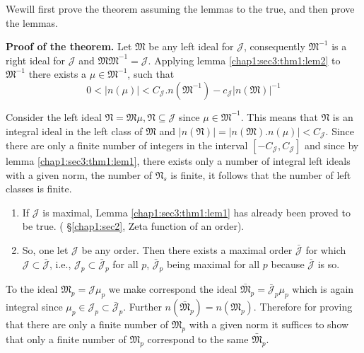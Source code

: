 We\pageoriginale will first prove the theorem assuming the lemmas to the true, and
then prove the lemmas. 

\medskip
\noindent \textbf{Proof of the theorem.}
  Let $\mathfrak{M}$ be any left ideal for $\mathcal{J}$, consequently
  $\mathfrak{M}^{-1}$ is a right ideal for $\mathcal{J}$ and
  $\mathfrak{M} \mathfrak{M}^{-1} = \mathcal{J}$. Applying
  lemma \ref{chap1:sec3:thm1:lem2} 
  to $\mathfrak{M}^{-1}$ there exists a $\mu \in \mathfrak{M}^{-1}$,
  such that  
  $$
  0 <  |n (\mu) |  < C_{\mathcal{J}}. n (\mathfrak{M}^{-1}) -
    c_{\mathcal{J}} | n(\mathfrak{M}) |^{-1} 
  $$

Consider the left ideal $\mathfrak{N}=\mathfrak{M} \mu,  \mathfrak{N}
\subseteq \mathcal{J}$ since $\mu \in \mathfrak{M}^{-1}$. This means that
$\mathfrak{N}$ is an integral ideal in the left class of
$\mathfrak{M}$ and $|n(\mathfrak{N})|= | n(\mathfrak{M}). n (\mu) | <
C_\mathcal{J}$. Since there are only a finite number of integers in
the interval $[-C_\mathcal{J},C_\mathcal{J}]$ and since by
lemma \ref{chap1:sec3:thm1:lem1},
there exists only a number of integral left ideals with a given norm,
the number of $\mathfrak{N}_s$ is finite, it follows that the number
of left classes is finite. 

\begin{proofoflemma}\label{chap1:sec3:polem1}
  \begin{enumerate}[\rm (a)]
  \item If $\mathcal{J}$ is maximal, Lemma \ref{chap1:sec3:thm1:lem1} has
    already been proved 
    to be true. ( \S \ref{chap1:sec2},  Zeta function of an order). 
  \item So, one let $\mathcal{J}$ be any order. Then there exists a
    maximal order $\bar{\mathcal{J}}$ for which $\mathcal{J} \subset
    \bar{\mathcal{J}}$, i.e., $\mathcal{J}_p \subset
    \bar{\mathcal{J}}_p$ for all $p$, $\bar{\mathcal{J}}_p$ being
    maximal for all $p$ because $\bar{\mathcal{J}}$ is so.  
  \end{enumerate}
\end{proofoflemma}

To the ideal $\mathfrak{M}_p = \mathcal{J} \mu_p$ we make correspond
the ideal $\bar{\mathfrak{M}}_p= \bar{\mathcal{J}}_p \mu_p$ which is
again integral since $\mu_p \in \mathcal{J} _p \subset
\bar{\mathcal{J}}_p$. Further $n(\bar{\mathfrak{M}}_p)= n
(\mathfrak{M}_p)$. Therefore for proving that there are only a finite
number of $\mathfrak{M}_p$ with a given norm it suffices to show that
only a finite number of $\mathfrak{M}_p$ correspond to the same
$\bar{\mathfrak{M}}_p$. 
 

